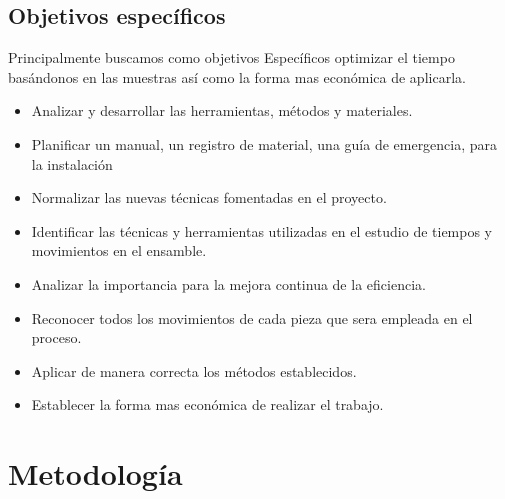     \subsection{Objetivos específicos }
    Principalmente buscamos como objetivos Específicos optimizar el tiempo basándonos en las muestras así como la forma mas económica de aplicarla.  
    \begin{itemize}
        \item Analizar y desarrollar las herramientas, métodos y materiales.
        \item Planificar un manual, un registro de material, una guía de emergencia,  para la instalación   
        \item Normalizar las nuevas técnicas fomentadas en el proyecto.
        \item Identificar las técnicas y herramientas utilizadas en el estudio de tiempos y movimientos en el ensamble.
        \item Analizar la importancia  para la mejora continua de la eficiencia.
        \item Reconocer todos los movimientos de cada pieza que sera empleada en el proceso.
        \item Aplicar de manera correcta los métodos establecidos.
        \item Establecer la forma mas económica de realizar el trabajo.
    \end{itemize}
    \section{Metodología}
    
